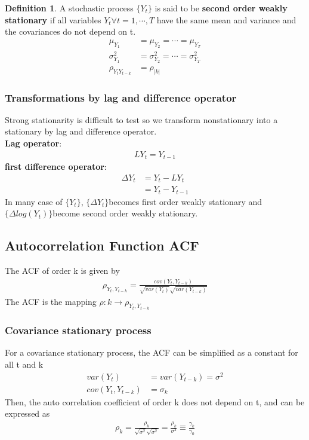 \documentclass{article}
\theoremstyle{definition}
\newtheorem{definition}{Definition}[section]
\theoremstyle{thrm}
\theoremstyle{lma}
\theoremstyle{ppst}
\theoremstyle{crlr}
\begin{document}
\begin{definition}
	A stochastic process $\{Y_t\}$ is said to be \textbf{second order weakly stationary }if all variables $Y_t \forall t = 1,\cdots, T$ have the same mean and variance and the covariances do not depend on t.
\begin{align*}
	\mu_{Y_1} &= \mu_{Y_2} = \cdots = \mu_{Y_T}\\
	\sigma^2_{Y_1} &= \sigma^2_{Y_2} = \cdots = \sigma^2_{Y_T}\\
	\rho_{Y_tY_{t-k}}&= \rho_{|k|}
\end{align*}
\end{definition}

\subsubsection{Transformations by lag and difference operator}
Strong stationarity is difficult to test so we transform nonstationary into a stationary by lag and difference operator.\\
\textbf{Lag operator}:
\begin{align*}
	LY_t = Y_{t-1}
\end{align*}
\textbf{first difference operator}:
\begin{align*}
	\Delta Y_t &= Y_t-LY_t\\
	&= Y_t-Y_{t-1}
\end{align*}
In many case of $\{Y_t\}$, $\{\Delta Y_t\}$becomes first order weakly stationary and $\{\Delta log(Y_t)\}$become second order weakly stationary.
\subsection{Autocorrelation Function ACF}
The ACF of order k is given by 
\begin{align*}
	\rho_{Y_t, Y_{t-k}} = \frac{cov(Y_t, Y_{t-k})}{\sqrt{var(Y_t)}\sqrt{var(Y_{t-k})}}
\end{align*}
The ACF is the mapping $\rho:k\to \rho_{Y_t, Y_{t-k}}$
\subsubsection{Covariance stationary process}
For a covariance stationary process, the ACF can be simplified as a constant for all t and k
\begin{align*}
	var(Y_t) &= var(Y_{t-k}) = \sigma^2\\
	cov(Y_t,Y_{t-k}) &= \sigma_k
\end{align*}
Then, the auto correlation coefficient of order k does not depend on t, and can be expressed as 
\begin{align*}
	\rho_k = \frac{\rho_k}{\sqrt{\sigma^2}\sqrt{\sigma^2}} = \frac{\rho_k}{\sigma^2}\equiv \frac{\gamma_k}{\gamma_0}
\end{align*}
\end{document}
